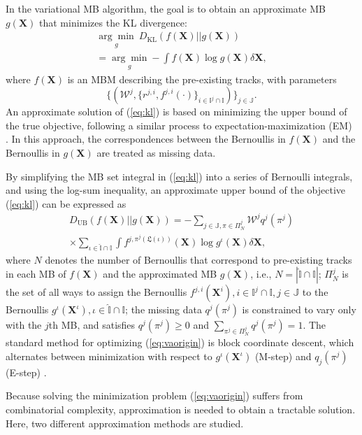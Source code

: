 \documentclass[journal]{IEEEtran}
\begin{document}
In the variational MB algorithm, the goal is to obtain an approximate MB $g(\mathbf{X})$ that minimizes the KL divergence:
\begin{multline}
\underset{g}{\arg\min}~D_{\text{KL}}(f(\mathbf{X})||g(\mathbf{X})) \\= \underset{g}{\arg\min}-\int f(\mathbf{X})\log g(\mathbf{X})\delta\mathbf{X},
\label{eq:kl}
\end{multline}
where $f(\mathbf{X})$ is an MBM describing the pre-existing tracks, with parameters
\begin{equation}
    \{(\mathcal{W}^j,\{r^{j,i},f^{j,i}(\cdot)\}_{i\in\mathbb{I}^j\cap\mathbb{I}})\}_{j\in\mathbb{J}}.
\end{equation}
An approximate solution of (\ref{eq:kl}) is based on minimizing the upper bound of the true objective, following a similar process to expectation-maximization (EM) \cite{em}. In this approach, the correspondences between the Bernoullis in $f(\mathbf{X})$ and the Bernoullis in $g(\mathbf{X})$ are treated as missing data. 

By simplifying the MB set integral in (\ref{eq:kl}) into a series of Bernoulli integrals, and using the log-sum inequality, an approximate upper bound of the objective (\ref{eq:kl}) can be expressed as \cite{variational}
\begin{multline}
D_{\text{UB}}(f(\mathbf{X})||g(\mathbf{X}))= -\sum_{j\in\mathbb{J},\pi\in\Pi^j_N}\mathcal{W}^jq^j(\pi^j)\\\times\sum_{\iota\in\hat{\mathbb{I}}\cap\mathbb{I}}\int f^{j,\pi^j(\mathfrak{L}(\iota))}(\mathbf{X})\log g^{\iota}(\mathbf{X})\delta \mathbf{X},
\label{eq:vaorigin}
\end{multline}
where $N$ denotes the number of Bernoullis that correspond to pre-existing tracks in each MB of $f(\mathbf{X})$ and the approximated MB $g(\mathbf{X})$, i.e., $N=|\hat{\mathbb{I}}\cap\mathbb{I}|$; $\Pi^j_N$ is the set of all ways to assign the Bernoullis $f^{j,i}(\mathbf{X}^i), i\in\mathbb{I}^j\cap\mathbb{I}, j\in\mathbb{J}$ to the Bernoullis $g^{\iota}(\mathbf{X}^{\iota}), \iota\in\hat{\mathbb{I}}\cap\mathbb{I}$; the missing data $q^j(\pi^j)$ is constrained to vary only with the $j$th MB, and satisfies $q^j(\pi^j)\geq0$ and  $\sum_{\pi^j\in\Pi^j_N} q^j(\pi^j) = 1$. The standard method for optimizing (\ref{eq:vaorigin}) is block coordinate descent, which alternates between minimization with respect to $g^{\iota}(\mathbf{X}^{\iota})$ (M-step) and $q_j(\pi^j)$ (E-step) \cite{variational}.

Because solving the minimization problem (\ref{eq:vaorigin}) suffers from combinatorial complexity, approximation is needed to obtain a tractable solution. Here, two different approximation methods are studied.
\end{document}

